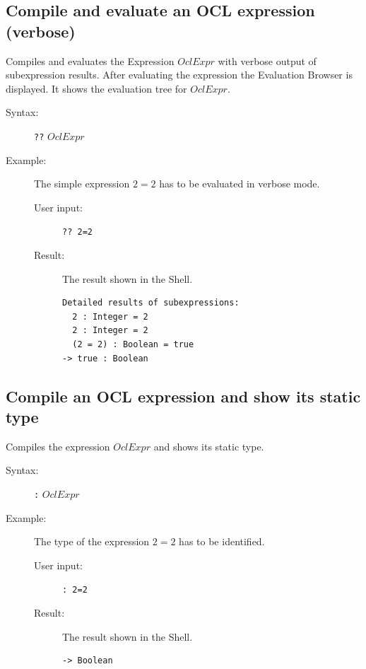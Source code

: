 \documentclass[a4paper,titlepage,oneside,final]{scrreprt} %
\begin{document}
\subsection{Compile and evaluate an OCL expression (verbose)}
Compiles and evaluates the Expression $\mathit{OclExpr}$ with verbose output of
subexpression results. After evaluating the expression the Evaluation Browser is displayed.
It shows the evaluation tree for $\mathit{OclExpr}$.
\begin{description}
\item[Syntax:] \verb+??+ $\mathit{OclExpr}$
\item[Example:] The simple expression $2=2$ has to be evaluated in verbose mode.
\begin{description}
\item[User input:]\verb+?? 2=2+
\item[Result:] The result shown in the Shell.
\begin{verbatim}
Detailed results of subexpressions:
  2 : Integer = 2
  2 : Integer = 2
  (2 = 2) : Boolean = true
-> true : Boolean
\end{verbatim}
\end{description}
\end{description}
\subsection{Compile an OCL expression and show its static type}
Compiles the expression $\mathit{OclExpr}$ and shows its static type.
\begin{description}
\item[Syntax:] \verb+:+ $\mathit{OclExpr}$
\item[Example:] The type of the expression $2=2$ has to be identified.
\begin{description}
\item[User input:]\verb+: 2=2+
\item[Result:] The result shown in the Shell.
\begin{verbatim}
-> Boolean
\end{verbatim}
\end{description}
\end{description}
\end{document}
